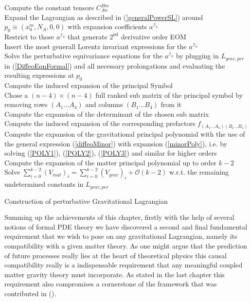 \documentclass[a4paper,12pt, DIV=14, BCOR=5mm, twoside, headsepline]{scrbook}
\begin{document}
%
%
%
\begin{algorithm}[ht]
\SetAlgoLined
{}
Compute the constant tensors $C^{Bm}_{An}$ \\
Expand the Lagrangian as described in (\ref{generalPowerSL}) around $p_0 \equiv (x_0^m,N_A,0,0)$ with expansion coefficients $a^{\mathcal{I}_k}$\\
Restrict to those $a^{\mathcal{I}_k}$ that generate $2^{\text{nd}}$ derivative order EOM \\
Insert the most generall Lorentz invariant expressions for the $a^{\mathcal{I}_k}$\\
Solve the perturbative equivariance equations for the $a^{\mathcal{I}_k}$ by plugging in $L_{grav,per}$ in (\ref{DiffeoEqnFormal}) and all necessary prolongations and evaluating the resulting expressions at $p_0$\\
Compute the induced expansion of the principal Symbol\\
Chose a $(n-4) \times (n-4)$ full ranked sub matrix of the principal symbol by removing rows $(A_1...A_4)$ and columns $(B_1...B_4)$ from it \\
Compute the expansion of the determinant of the chosen sub matrix\\
Compute the induced expansion of the corresponding prefactors $f_{(A_1...A_4)(B_1...B_4)}$ \\
Compute the expansion of the gravitational principal polynomial with the use of the general expression (\ref{diffeoMinor}) with expansion (\ref{minorPoly}), i.e. by solving (\ref{POLY1}), (\ref{POLY2}), (\ref{POLY3}) and similar for higher orders \\
Compute the expansion of the matter principal polynomial up to order $k-2$\\
Solve $\sum_{i=0}^{k-2} (V_{mat})_i = \sum _{i=0}^{k-2}(V_{grav})_i + \mathcal{O}(k-2)$ w.r.t. the remaining undetermined constants in $L_{grav,per}$
 \caption{Construction of perturbative Gravitational Lagrangian}\label{Algo2}
\end{algorithm}

Summing up the achievements of this chapter, firstly with the help of several notions of formal PDE theory we have discovered a second and final fundamental requirement that we wish to pose on any gravitational Lagrangian, namely its compatibility with a given matter theory. As one might argue that the prediction of future processes really lies at the heart of theoretical physics this causal compatibility really is a indispensable requirement that any meaningful coupled matter gravity theory must incorporate. As stated in the last chapter this requirement also compromises a cornerstone of the framework that was contributed in (\cite{2018PhRvD..97h4036D}). 
\end{document}
